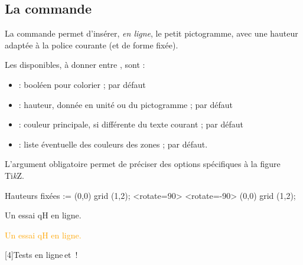 \documentclass[french,11pt,a4paper]{article}
\providecommand\tikzlogo{Ti\textit{k}Z}
\let\TikZ\tikzlogo
\begin{document}
\subsection{La commande}

La commande permet d'insérer, \textit{en ligne}, le petit pictogramme, avec une hauteur adaptée à la police courante (et de forme fixée). 

\smallskip

Les  disponibles, à donner entre \MontreCode{[...]}, sont :

\begin{itemize}
	\item {} : booléen pour colorier ;  par défaut
	\item {} : hauteur, donnée en unité ou  du pictogramme ;  par défaut
	\item {} : couleur principale, si différente du texte courant ;  par défaut
	\item {} : liste éventuelle des couleurs des zones ;  par défaut.
\end{itemize}

L'argument obligatoire permet de préciser des options spécifiques à la figure \TikZ.

\begin{DemoCode}{}
Hauteurs fixées := {\tikz\draw (0,0) grid (1,2);}%
\pictobullseye[height=2cm,maincolor=red]%
\pictobullseye[height=1cm,maincolor=blue]<rotate=90>%
\pictobullseye[height=0.75cm,maincolor=gray]<rotate=-90>%
{\tikz\draw (0,0) grid (1,2);}
\end{DemoCode}

\begin{DemoCode}{}
Un essai q\pictobullseye\pictobullseye[height=auto,maincolor=red]H en ligne.
\end{DemoCode}

\begin{DemoCode}{}
{\Huge\sffamily\textcolor{orange}{Un essai q\pictobullseye\pictobullseye[height=auto]H en ligne.}}
\end{DemoCode}

\begin{DemoCode}{}
\scalebox{4}[4]{Tests en ligne\,\pictobullseye[height=auto,colors,listcolors={green!50,orange!50,red!50}] et \,\pictobullseye[colors,listcolors={red!50,yellow!50,teal!50}]!}
\end{DemoCode}
\end{document}
